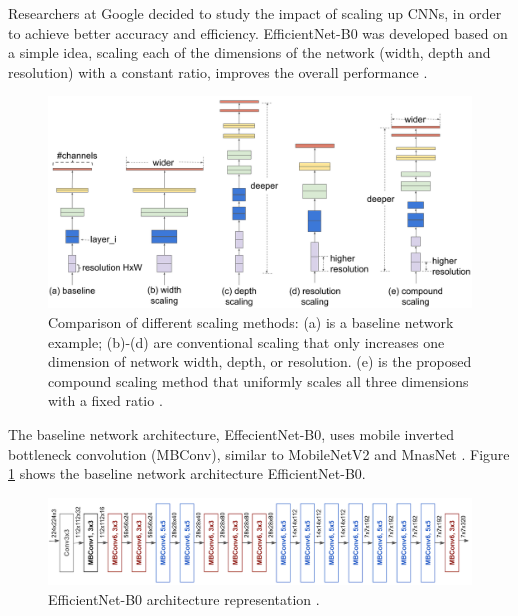\par Researchers at Google decided to study the impact of scaling up CNNs, in order to achieve better accuracy and efficiency. EfficientNet-B0 was developed based on a simple idea, scaling each of the dimensions of the network (width, depth and resolution) with a constant ratio, improves the overall performance \cite{tan2019efficientnet}.

\begin{figure}[htb]
    \centering
    \includegraphics[scale = 0.25]{Sections/2StateOfTheArt/2_images/efficientNet_scale.png}
    \caption{Comparison of different scaling methods:  (a) is a baseline network example; (b)-(d) are conventional scaling that only increases one dimension of network  width, depth, or resolution. (e) is the proposed compound scaling method that uniformly scales all three dimensions with a fixed ratio \cite{tan2019efficientnet}.
    } 

\end{figure}

\newpage

\par The baseline network architecture, EffecientNet-B0, uses mobile inverted bottleneck convolution (MBConv), similar to MobileNetV2 \cite{s2018mobilenetv2} and MnasNet \cite{tan2018mnasnet}. Figure \ref{fig:eff} shows the baseline network architecture EfficientNet-B0.

\begin{figure}[htb]
    \centering
    \includegraphics[scale = 0.22]{Sections/2StateOfTheArt/2_images/efficientNet_Arch.png}
    \caption{EfficientNet-B0 architecture representation \cite{Tan}.} 
    \label{fig:eff}

\end{figure}


